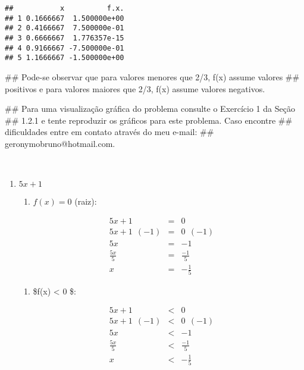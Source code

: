 \documentclass[]{book}
\newenvironment{Shaded}{\begin{snugshade}}{\end{snugshade}}
\newcommand{\NormalTok}[1]{#1}
\providecommand{\tightlist}{%
  \setlength{\itemsep}{0pt}\setlength{\parskip}{0pt}}
\begin{document}
\begin{enumerate}
\begin{verbatim}
##           x          f.x.
## 1 0.1666667  1.500000e+00
## 2 0.4166667  7.500000e-01
## 3 0.6666667  1.776357e-15
## 4 0.9166667 -7.500000e-01
## 5 1.1666667 -1.500000e+00
\end{verbatim}

\begin{Shaded}
\begin{Highlighting}[]
\NormalTok{##  Pode-se observar que para valores menores que 2/3, f(x) assume valores}
\NormalTok{## positivos e para valores maiores que 2/3, f(x) assume valores negativos.}

\NormalTok{##  Para uma visualização gráfica do problema consulte o Exercício 1 da Seção}
\NormalTok{## 1.2.1 e tente reproduzir os gráficos para este problema. Caso encontre}
\NormalTok{## dificuldades entre em contato através do meu e-mail:}
\NormalTok{## geronymobruno@hotmail.com.}
\end{Highlighting}
\end{Shaded}

  ~

  \begin{enumerate}
  \def\labelenumii{\alph{enumii})}
  \setcounter{enumii}{3}
  \item
    \(5x+1\)

    \begin{enumerate}
    \def\labelenumiii{\roman{enumiii})}
    \tightlist
    \item
      \(f(x) = 0\) (raiz):
    \end{enumerate}

    \begin{eqnarray}
    5x+1 &=& 0 \nonumber \\
    5x+1 \ \ (-1) &=& 0 \ \ (-1) \nonumber \\
    5x &=& -1 \nonumber \\
    \frac{5x}{5} &=& \frac{-1}{5} \nonumber \\
    x &=& -\frac{1}{5} \nonumber
    \end{eqnarray}

    \begin{enumerate}
    \def\labelenumiii{\roman{enumiii})}
    \setcounter{enumiii}{1}
    \tightlist
    \item
      \$f(x) \textless{} 0 \$:
    \end{enumerate}

    \begin{eqnarray}
    5x+1 &<& 0 \nonumber \\
    5x+1 \ \ (-1) &<& 0 \ \ (-1) \nonumber \\
    5x &<& -1 \nonumber \\
    \frac{5x}{5} &<& \frac{-1}{5} \nonumber \\
    x &<& -\frac{1}{5} \nonumber
    \end{eqnarray}


\end{enumerate}
\end{enumerate}
\end{document}
